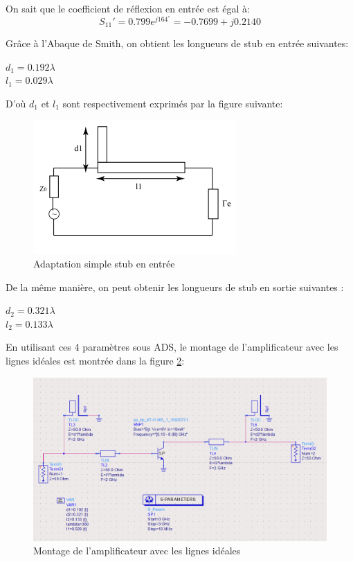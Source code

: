 \documentclass[french]{article}
\begin{document}
On sait que le coefficient de réflexion en entrée est égal à:
\begin{equation}
	S_{11}'=0.799e^{j164^{\circ}}=-0.7699+j0.2140
\end{equation}

Grâce à l’Abaque de Smith, on obtient les longueurs de stub en entrée suivantes:

{\centering
	$d_{1}=0.192\lambda$\\
	$l_{1}=0.029\lambda$\\
}
	
D’où $d_{1}$ et $l_{1}$ sont respectivement exprimés par la figure suivante:
\begin{figure}[H]
	\centering
	\includegraphics[width=0.6\linewidth]{../5SynthAmp/simple_stub_e}
	\caption{Adaptation simple stub en entrée}
	\label{fig:simple_stub_e}
\end{figure}

De la même manière, on peut obtenir les longueurs de stub en sortie suivantes :
 
{\centering
	$d_{2}=0.321\lambda$\\
	$l_{2}=0.133\lambda$\\
}

En utilisant ces 4 paramètres sous ADS, le montage de l’amplificateur avec les lignes idéales est montrée dans la figure \ref{fig:ligne_ideal}:
\begin{figure}[H]
	\centering
	\includegraphics[width=0.9\linewidth]{../5SynthAmp/ligne_ideal}
	\caption{Montage de l’amplificateur avec les lignes idéales}
	\label{fig:ligne_ideal}
\end{figure}
\end{document}
